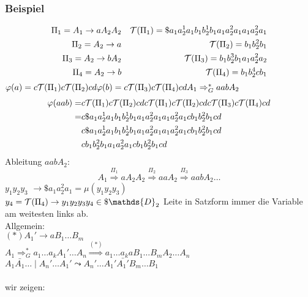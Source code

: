         \subsubsection{Beispiel}
            \begin{align*}
                \Pi_1=A_1\rightarrow aA_2A_2 && \mathcal{T}(\Pi_1)=\$a_1a_2^1a_1b_1b_2^1b_1a_1a_2^2a_1a_1a_2^2a_1\\
                \Pi_2=A_2\rightarrow a && \mathcal{T}(\Pi_2)=b_1b_2^2b_1\\
                \Pi_3=A_2\rightarrow bA_2 && \mathcal{T}(\Pi_3)=b_1b_2^3b_1a_1a_2^2a_2\\
                \Pi_4=A_2\rightarrow b && \mathcal{T}(\Pi_4)=b_1b_2^4c b_1
            \end{align*}
            $\varphi(a) = c\mathcal{T}(\Pi_1)c\mathcal{T}(\Pi_2)cd\\
            \varphi(b) = c\mathcal{T}(\Pi_3)c\mathcal{T}(\Pi_4)cd\\
            A_1\Rightarrow_G^* aabA_2$\\
            \begin{align*}
                \varphi(aab) =& c\mathcal{T}(\Pi_1)c\mathcal{T}(\Pi_2)cdc\mathcal{T}(\Pi_1)c\mathcal{T}(\Pi_2)cdc\mathcal{T}(\Pi_3)c\mathcal{T}(\Pi_4)cd\\
                =& c\$a_1a_2^1a_1b_1b_2^1b_1a_1a_2^2a_1a_1a_2^2a_1cb_1b_2^2b_1cd\\
                &c\$a_1a_2^1a_1b_1b_2^1b_1a_1a_2^2a_1a_1a_2^2a_1cb_1b_2^2b_1cd\\
                &cb_1b_2^2b_1a_1a_2^2a_1cb_1b_2^2b_1cd
            \end{align*}
            Ableitung $aabA_2$:\\
            $$A_1\overset{\Pi_1}{\Rightarrow}aA_2A_2\overset{\Pi_2}{\Rightarrow}aaA_2\overset{\Pi_3}{\Rightarrow}aabA_2\dots$$
            $y_1y_2y_3$ $\rightarrow \$a_1a_2^2a_1=\mu(y_1y_2y_3)$\\
            $y_4=\Tau(\Pi_4)\rightarrow y_1y_2y_3y_4\in\$\mathds{D}_2$
            Leite in Satzform immer die Variable am weitesten links ab.\\
            Allgemein:\\
            $(*) A_1'\rightarrow aB_1\dots B_m$\\
            $A_1\Rightarrow_G^* a_1\dots a_kA_1'\dots A_n \overset{(*)}{\Rightarrow} a_1\dots a_kaB_1\dots B_mA_2\dots A_n$\\
            $A_1\bar{A_1}\dots \mid A_n'\dots A_1'\leadsto A_n'\dots A_1'\bar{A_1'}B_m\dots B_1$
	\\\\ wir zeigen:\\
